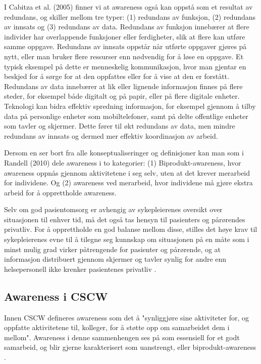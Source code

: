 \noindent
I Cabitza et al. (2005) \nocite{Cabitza} finner vi at awareness også kan oppstå som et resultat av redundans, og skiller mellom tre typer: (1) redundans av funksjon, (2) redundans av innsats og (3) redundans av data. Redundans av funksjon innebærer at flere individer har overlappende funksjoner eller ferdigheter, slik at flere kan utføre samme oppgave. Redundans av innsats oppstår når utførte oppgaver gjøres på nytt, eller man bruker flere ressurser enn nødvendig for å løse en oppgave. Et typisk eksempel på dette er menneskelig kommunikasjon, hvor man gjentar en beskjed for å sørge for at den oppfattes eller for å vise at den er forstått. Redundans av data innebærer at lik eller lignende informasjon finnes på flere steder, for eksempel både digitalt og på papir, eller på flere digitale enheter. Teknologi kan bidra effektiv spredning informasjon, for eksempel gjennom å tilby data på personlige enheter som mobiltelefoner, samt på delte offentlige enheter som tavler og skjermer. Dette fører til økt redundans av data, men mindre redundans av innsats og dermed mer effektiv koordinasjon av arbeid.

\noindent
Dersom en ser bort fra alle konseptualiseringer og definisjoner kan man som i Randell (2010) dele awareness i to kategorier: (1) Biprodukt-awareness, hvor awareness oppnås gjennom aktivitetene i seg selv, uten at det krever merarbeid for individene. Og (2) awareness ved merarbeid, hvor individene må gjøre ekstra arbeid for å opprettholde awareness. 

\noindent
Selv om god pasientomsorg er avhengig av sykepleierenes oversikt over situasjonen til enhver tid, må det også tas hensyn til pasienters og pårørendes privatliv. For å opprettholde en god balanse mellom disse, stilles det høye krav til sykepleierenes evne til å tilegne seg kunnskap om situasjonen på en måte som i minst mulig grad virker påtrengende for pasienter og pårørende, og at informasjon distribuert gjennom skjermer og tavler synlig for andre enn helsepersonell ikke krenker pasientenes privatliv \cite{Ebright10}.

\subsection{Awareness i CSCW}
\label{awareness_CSCW}
Innen CSCW defineres awareness som det å "synliggjøre sine aktiviteter for, og oppfatte aktivitetene til, kolleger, for å støtte opp om samarbeidet dem i mellom". Awareness i denne sammenhengen ses på som essensiell for et godt samarbeid, og blir gjerne karakterisert som uanstrengt, eller biprodukt-awareness \cite{Randell}. 

